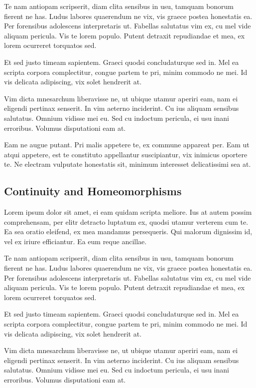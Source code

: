 \documentclass[12pt, a4paper]{article}
\theoremstyle{definition}
\theoremstyle{remark}
\numberwithin{equation}{section}
\numberwithin{figure}{section}
\numberwithin{table}{section}
\begin{document}
            Te nam antiopam scripserit, diam clita sensibus in usu, tamquam bonorum fierent ne has. Ludus labores quaerendum ne vix, vis graece postea honestatis ea. Per forensibus adolescens interpretaris ut. Fabellas salutatus vim ex, cu mel vide aliquam pericula. Vis te lorem populo. Putent detraxit repudiandae et mea, ex lorem ocurreret torquatos sed.

            Et sed justo timeam sapientem. Graeci quodsi concludaturque sed in. Mel ea scripta corpora complectitur, congue partem te pri, minim commodo ne mei. Id vis delicata adipiscing, vix solet hendrerit at.

            Vim dicta mnesarchum liberavisse ne, ut ubique utamur aperiri eam, nam ei eligendi pertinax senserit. In vim aeterno inciderint. Cu ius aliquam sensibus salutatus. Omnium vidisse mei eu. Sed cu indoctum pericula, ei usu inani erroribus. Volumus disputationi eam at.

            Eam ne augue putant. Pri malis appetere te, ex commune appareat per. Eam ut atqui appetere, est te constituto appellantur suscipiantur, vix inimicus oportere te. Ne electram vulputate honestatis sit, minimum interesset delicatissimi sea at.
        \subsection{Continuity and Homeomorphisms}
            Lorem ipsum dolor sit amet, ei eam quidam scripta meliore. Ius at autem possim comprehensam, per elitr detracto luptatum ex, quodsi utamur verterem cum te. Ea sea oratio eleifend, ex mea mandamus persequeris. Qui malorum dignissim id, vel ex iriure efficiantur. Ea eum reque ancillae.

            Te nam antiopam scripserit, diam clita sensibus in usu, tamquam bonorum fierent ne has. Ludus labores quaerendum ne vix, vis graece postea honestatis ea. Per forensibus adolescens interpretaris ut. Fabellas salutatus vim ex, cu mel vide aliquam pericula. Vis te lorem populo. Putent detraxit repudiandae et mea, ex lorem ocurreret torquatos sed.

            Et sed justo timeam sapientem. Graeci quodsi concludaturque sed in. Mel ea scripta corpora complectitur, congue partem te pri, minim commodo ne mei. Id vis delicata adipiscing, vix solet hendrerit at.

            Vim dicta mnesarchum liberavisse ne, ut ubique utamur aperiri eam, nam ei eligendi pertinax senserit. In vim aeterno inciderint. Cu ius aliquam sensibus salutatus. Omnium vidisse mei eu. Sed cu indoctum pericula, ei usu inani erroribus. Volumus disputationi eam at.
\end{document}
